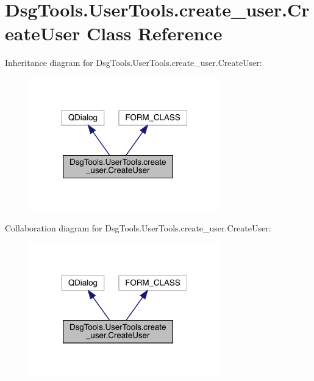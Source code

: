 \hypertarget{class_dsg_tools_1_1_user_tools_1_1create__user_1_1_create_user}{}\section{Dsg\+Tools.\+User\+Tools.\+create\+\_\+user.\+Create\+User Class Reference}
\label{class_dsg_tools_1_1_user_tools_1_1create__user_1_1_create_user}


Inheritance diagram for Dsg\+Tools.\+User\+Tools.\+create\+\_\+user.\+Create\+User\+:
\nopagebreak
\begin{figure}[H]
\begin{center}
\leavevmode
\includegraphics[width=234pt]{class_dsg_tools_1_1_user_tools_1_1create__user_1_1_create_user__inherit__graph}
\end{center}
\end{figure}


Collaboration diagram for Dsg\+Tools.\+User\+Tools.\+create\+\_\+user.\+Create\+User\+:
\nopagebreak
\begin{figure}[H]
\begin{center}
\leavevmode
\includegraphics[width=234pt]{class_dsg_tools_1_1_user_tools_1_1create__user_1_1_create_user__coll__graph}
\end{center}
\end{figure}
